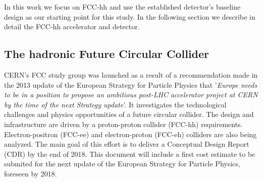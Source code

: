 In this work we focus on FCC-hh and use the established detector's baseline design as our starting point for this study. In the following section we describe in detail the FCC-hh accelerator and detector.

\subsection{The hadronic Future Circular Collider}
\label{section:FCC}

%

CERN's FCC study group was launched as a result of a recommendation made in the  2013 update of the European Strategy for Particle Physics that '\textit{Europe needs to be in a position to propose an ambitious post-LHC accelerator project at CERN by the time of the next Strategy update}'. It investigates the technological challenges and physics opportunities of a future circular collider. The design and infrastructure are driven by a proton-proton collider (FCC-hh) requirements. Electron-positron (FCC-ee) and electron-proton (FCC-eh) colliders are also being analyzed. The main goal of this effort is to deliver a Conceptual Design Report (CDR) by the end of 2018. This document will include a first cost estimate to be submited for the next update of the European Strategy for Particle Physics, foreseen by 2018.

